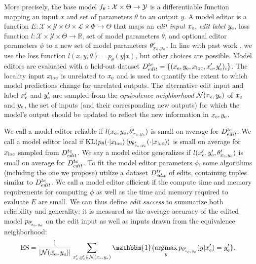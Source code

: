 \documentclass{article}
\begin{document}
More precisely, the base model $f_\theta:\mathcal{X} \times \Theta \rightarrow \mathcal{Y}$ is a differentiable function mapping an input $x$ and set of parameters $\theta$ to an output $y$. A model editor is a function $E : \mathcal{X} \times \mathcal{Y} \times \Theta \times \mathcal{L} \times \Phi \rightarrow \Theta$ that maps an \textit{edit input} $x_\text{e}$, \textit{edit label} $y_\text{e}$, loss function $l:\mathcal{X} \times \mathcal{Y} \times \Theta \rightarrow \mathbb{R}$, set of model parameters $\theta$, and optional editor parameters $\phi$ to a new set of model parameters $\theta'_{x_\text{e},y_\text{e}}$. In line with past work \citep{Sinitsin2020Editable,Cao2021EditingFK}, we use the loss function $l(x,y,\theta) = p_\theta(y|x)$, but other choices are possible. Model editors are evaluated with a held-out dataset $D^{te}_{edit} = \{(x_\text{e},y_\text{e},x_\text{loc},x_\text{e}',y_\text{e}')_i\}$. The locality input $x_\text{loc}$ is unrelated to $x_\text{e}$ and is used to quantify the extent to which model predictions change for unrelated outputs. The alternative edit input and label $x_\text{e}'$ and $y_\text{e}'$ are sampled from the \textit{equivalence neighborhood} $\mathcal{N}(x_\text{e},y_\text{e})$ of $x_\text{e}$ and $y_\text{e}$, the set of inputs (and their corresponding new outputs) for which the model's output should be updated to reflect the new information in $x_\text{e},y_\text{e}$.

We call a model editor reliable if $l(x_\text{e},y_\text{e},\theta'_{x_\text{e},y_\text{e}})$ is small on average for $D^{te}_{edit}$. We call a model editor local if $\text{KL}(p_\theta(\cdot | x_\text{loc}) \| p_{\theta'_{x_\text{e},y_\text{e}}}(\cdot | x_\text{loc}))$ is small on average for $x_\text{loc}$ sampled from $D^{te}_{edit}$. We say a model editor generalizes if $l(x_\text{e}',y_\text{e}',\theta'_{x_\text{e},y_\text{e}})$ is small on average for $D^{te}_{edit}$. To fit the model editor parameters $\phi$, some algorithms (including the one we propose) utilize a dataset $D^{tr}_{edit}$ of edits, containing tuples similar to $D^{te}_{edit}$. We call a model editor efficient if the compute time and memory requirements for computing $\phi$ as well as the time and memory required to evaluate $E$ are small. We can thus define \textit{edit success} to summarize both reliability and generality; it is measured as the average accuracy of the edited model $p_{\theta'_{x_\text{e},y_\text{e}}}$ on the edit input as well as inputs drawn from the equivalence neighborhood:
\begin{equation}
    \text{ES} = \frac{1}{|\mathcal{N}(\xe,\ye)|}\sum_{\xe',\ye' \in \mathcal{N}(\xe,\ye)}\mathbbm{1}\{\argmax_yp_{\theta'_{\xe,\ye}}(y|\xe') = \ye'\}.
    \label{eq:edit-success}
\end{equation}
\end{document}

